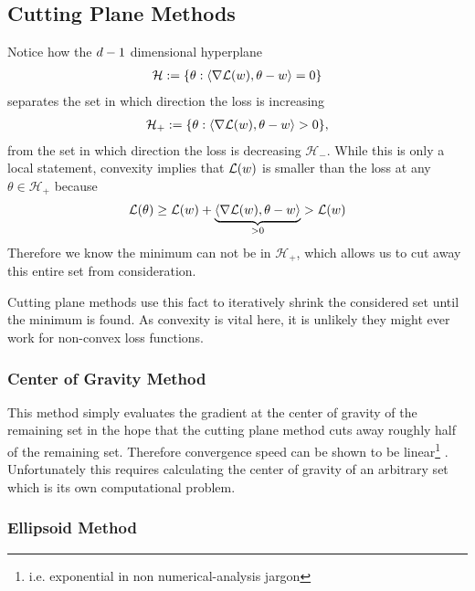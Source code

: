 \subsection{Cutting Plane Methods}

Notice how the \(d-1\) dimensional hyperplane
\begin{align*}
	\mathcal{H}
	:= \{\theta : \langle \nabla\mathcal{L}(w), \theta - w \rangle = 0\}
\end{align*}
separates the set in which direction the loss is increasing
\begin{align*}
	\mathcal{H}_+
	:= \{\theta : \langle \nabla\mathcal{L}(w), \theta - w \rangle > 0\},
\end{align*}
from the set in which direction the loss is decreasing \(\mathcal{H}_-\). While
this is only a local statement, convexity implies that \(\mathcal{L}(w)\) is
smaller than the loss at any \(\theta\in\mathcal{H}_+\) because
\begin{align*}
	\mathcal{L}(\theta)
	\ge \mathcal{L}(w) + \underbrace{\langle \nabla\mathcal{L}(w), \theta -w\rangle}_{>0}
	> \mathcal{L}(w)
\end{align*}
Therefore we know the minimum can not be in \(\mathcal{H}_+\), which allows us
to cut away this entire set from consideration.

Cutting plane methods use this fact to iteratively shrink the considered set
until the minimum is found. As convexity is vital here, it is unlikely they
might ever work for non-convex loss functions.

\subsubsection{Center of Gravity Method}

This method simply evaluates the gradient at the center of gravity of the
remaining set in the hope that the cutting plane method cuts away roughly half
of the remaining set. Therefore convergence speed can be shown to be
linear\footnote{i.e. exponential in non numerical-analysis jargon} 
\parencite[e.g.][Theorem 2.1]{bubeckConvexOptimizationAlgorithms2015}.
Unfortunately this requires calculating the center of gravity of an arbitrary
set which is its own computational problem. 

\subsubsection{Ellipsoid Method}

